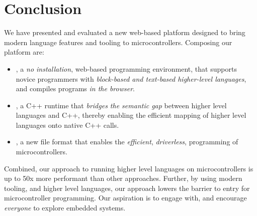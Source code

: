 \section{Conclusion}
\label{sec:conclude}

We have presented and evaluated a new web-based platform designed to bring modern language features and tooling to microcontrollers. Composing our platform are:

\begin{itemize}

\item \MCN, a \emph{no installation}, web-based programming environment, that supports novice programmers with \emph{block-based and text-based higher-level languages}, and compiles programs \emph{in the browser}.

\item \CON, a C++ runtime that \emph{bridges the semantic gap} between higher level languages and C++, thereby enabling the efficient mapping of higher level languages onto native C++ calls.

\item \UFN, a new file format that enables the \emph{efficient}, \emph{driverless}, programming of microcontrollers.

\end{itemize}

Combined, our approach to running higher level languages on microcontrollers is up to 50x more performant than other approaches. Further, by using modern tooling, and higher level languages, our approach lowers the barrier to entry for microcontroller programming. Our aspiration is to engage with, and encourage \emph{everyone} to explore embedded systems.
